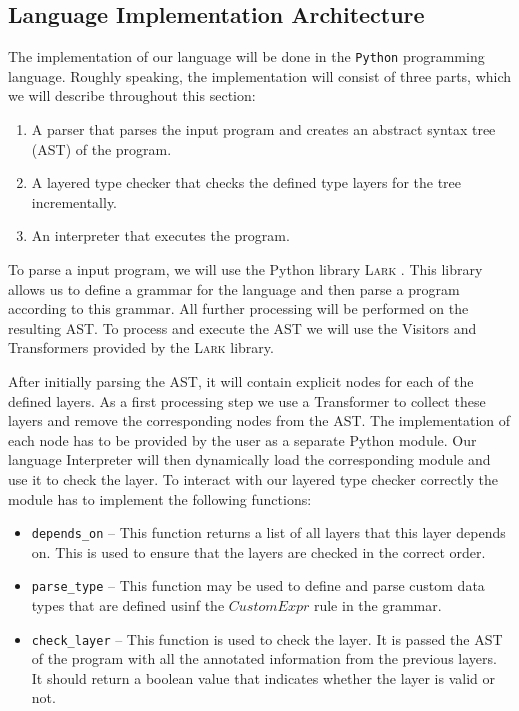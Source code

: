 \documentclass[acmsmall, review, screen]{acmart}
\newcommand{\Lark}[0]{\textsc{Lark}}
\begin{document}
\subsection{Language Implementation Architecture}
\label{ssec:architecture}

The implementation of our language will be done in the \texttt{Python} programming language. Roughly speaking, the implementation will consist of three parts, which we will describe throughout this section:

\begin{enumerate}
	\item A parser that parses the input program and creates an abstract syntax tree (AST) of the program.
	\item A layered type checker that checks the defined type layers for the tree incrementally.
	\item An interpreter that executes the program.
\end{enumerate}

To parse a input program, we will use the Python library \Lark{} \cite{Lark}. This library allows us to define a grammar for the language and then parse a program according to this grammar. All further processing will be performed on the resulting AST. To process and execute the AST we will use the Visitors and Transformers provided by the \Lark{} library.

After initially parsing the AST, it will contain explicit nodes for each of the defined layers. As a first processing step we use a Transformer to collect these layers and remove the corresponding nodes from the AST. The implementation of each node has to be provided by the user as a separate Python module. Our language Interpreter will then dynamically load the corresponding module and use it to check the layer. To interact with our layered type checker correctly the module has to implement the following functions:

\begin{itemize}
	\item \texttt{depends\_on} -- This function returns a list of all layers that this layer depends on. This is used to ensure that the layers are checked in the correct order.
	\item \texttt{parse\_type} -- This function may be used to define and parse custom data types that are defined usinf the $CustomExpr$ rule in the grammar. 
	\item \texttt{check\_layer} -- This function is used to check the layer. It is passed the AST of the program with all the annotated information from the previous layers. It should return a boolean value that indicates whether the layer is valid or not.
\end{itemize}
\end{document}
